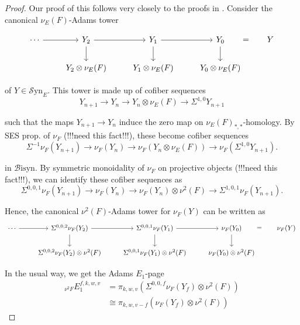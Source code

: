 \documentclass[10pt]{amsart}
\theoremstyle{definition}
\numberwithin{figure}{section}
\numberwithin{equation}{section}
\theoremstyle{cited}
\newcommand{\Syn}{\mathcal{S}\mathrm{yn}}
\newcommand{\Bisyn}{\mathcal{B}\mathrm{isyn}}
\begin{document}
\begin{proof}
  	Our proof of this follows very closely to the proofs in \cite[App. A]{BHS19}. Consider  the canonical $\nu_E(F)$-Adams tower

\begin{equation*}
	\begin{tikzcd}
\cdots \arrow[r] & Y_2 \arrow[r] \arrow[d] & Y_1 \arrow[r] \arrow[d] & Y_0 \arrow[r, phantom, "{=}" description] \ar[d] & Y \\
                 & Y_2\otimes\nu_E(F)      & Y_1\otimes\nu_E(F)      & Y_0\otimes\nu_E(F) &     
\end{tikzcd}
\end{equation*}

of $Y\in\Syn_E$. This tower is made up of cofiber sequences
\begin{equation*}
Y_{n+1}\to Y_n\to Y_n\otimes\nu_E(F)\to\Sigma^{1,0}Y_{n+1}
\end{equation*}

such that the maps $Y_{n+1}\to Y_n$ induce the zero map on $\nu_E(F)_{*,*}$-homology. By SES prop. of $\nu_F$ (!!!need this fact!!!), these become cofiber sequences
\begin{equation*}
\Sigma^{-1}\nu_F(Y_{n+1})\to \nu_F(Y_n)\to \nu_F(Y_n\otimes\nu_E(F))\to\nu_F(\Sigma^{1,0}Y_{n+1}).
\end{equation*}

in $\Bisyn$. By symmetric monoidality of $\nu_F$ on projective objects (!!!need this fact!!!), we can identify these cofiber sequences as
$$
\Sigma^{0,0,1}\nu_F(Y_{n+1})\to \nu_F(Y_n)\to \nu_F(Y_n)\otimes\nu^2(F)\to\Sigma^{1,0,1}\nu_F(Y_{n+1}).
$$

Hence, the canonical $\nu^2(F)$-Adams tower for $\nu_F(Y)$ can be written as
\begin{equation*}
	\begin{tikzcd}
\cdots \arrow[r] & \Sigma^{0,0,2}\nu_F(Y_2) \arrow[r] \arrow[d] & \Sigma^{0,0,1}\nu_F(Y_1) \arrow[r] \arrow[d] & \nu_F(Y_0) \arrow[r, phantom, "{=}" description] \ar[d] & \nu_F(Y) \\
                 & \Sigma^{0,0,2}\nu_F(Y_2)\otimes\nu^2(F)      & \Sigma^{0,0,1}\nu_F(Y_1)\otimes\nu^2(F)      & \nu_F(Y_0)\otimes\nu^2(F)     
\end{tikzcd} 
\end{equation*}

In the usual way, we get the Adams $E_1$-page
$$
\begin{aligned}
{}_{\nu^2F}E_1^{f,k,w,v}&=\pi_{k,w,v}(\Sigma^{0,0,f}\nu_F(Y_f)\otimes\nu^2(F)) \\
&\cong\pi_{k,w,v-f}(\nu_F(Y_f)\otimes\nu^2(F))
\end{aligned}
$$


\end{proof}
\end{document}
